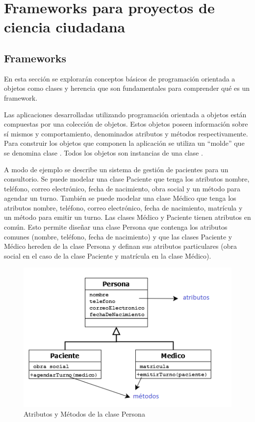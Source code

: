 \chapter{Frameworks para proyectos de ciencia ciudadana}

\section{Frameworks} \label{sFrameworks}

	En esta sección se explorarán conceptos básicos de programación orientada a objetos como clases y herencia que son fundamentales para comprender qué es un framework.
 
	Las aplicaciones desarrolladas utilizando programación orientada a objetos están compuestas por una colección de objetos. Estos objetos poseen información sobre sí mismos y comportamiento, denominados atributos y métodos respectivamente. Para construir los objetos que componen la aplicación se utiliza un “molde” que se denomina clase \cite{weisfeld2008object}. Todos los objetos son instancias de una clase \cite{budd2008introduction}. 
 
	A modo de ejemplo se describe un sistema de gestión de pacientes para un consultorio. Se puede modelar una clase Paciente que tenga los atributos nombre, teléfono, correo electrónico, fecha de nacimiento, obra social y un método para agendar un turno. También se puede modelar una clase Médico que tenga los atributos nombre, teléfono, correo electrónico, fecha de nacimiento, matrícula y un método para emitir un turno. Las clases Médico y Paciente tienen atributos en común. Esto permite diseñar una clase Persona que contenga los atributos comunes (nombre, teléfono, fecha de nacimiento) y que las clases Paciente y Médico hereden de la clase Persona y definan sus atributos particulares (obra social en el caso de la clase Paciente y matrícula en la clase Médico). 
	
	\begin{figure}[H]
		\centering
		\includegraphics[scale=0.4]{04-framework/personaAtributosMetodos.png}
		\caption{Atributos y Métodos de la clase Persona}
		\label{fig:umlClassAttributesMethods}
	\end{figure}
	
